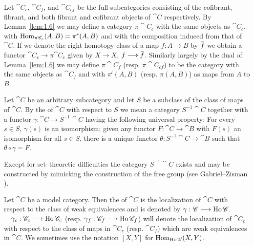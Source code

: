\documentclass[../main]{subfiles}
\begin{document}
Let ${\cat C}_c$, ${\cat C}_f$, and ${\cat C}_{cf}$ be the full subcategories consisting of the cofibrant, fibrant, and both fibrant and cofibrant objects of $\cat C$ respectively. By Lemma~\ref{lem:1.6} we may define a category $\pi \cat C_c$ with the same objects as ${\cat C}_c$, with \newline$\operatorname{Hom}_{\pi \mathscr{C}_c}(A, B) = \pi^r(A, B)$ and with the composition induced from that of $\cat C$. If we denote the right homotopy class of a map $f : A \longrightarrow B$ by $\xoverline f$ we obtain a functor ${\cat C}_c \longrightarrow \pi {\cat C}_c$ given by $X \longrightarrow X$, $f \longrightarrow \xoverline f$. Similarly largely by the dual of Lemma~\ref{lem:1.6} we may define $\pi \cat C_f$ (resp. $\pi \cat C_{cf}$) to be the category with the same objects as ${\cat C}_f$ and with $\pi^l(A, B)$ (resp. $\pi(A, B)$) as maps from $A$ to $B$. 

\begin{definition}\label{def:1.1.5}
Let $\cat C$ be an arbitrary subcategory and let $S$ be a subclass of the class of maps of $\cat C$. By the  of $\cat C$ with respect to $S$ we mean a category $S^{-1} \cat C$ together with a functor $\gamma : \cat C \longrightarrow S^{-1} \cat C$ having the following universal property: For every $s \in S$, $\gamma(s)$ is an isomorphism; given any functor $F  : \cat C \longrightarrow \cat B$ with $F(s)$ an isomorphism for all $s \in S$, there is a unique functor $\theta : S^{-1} \cat C \longrightarrow \cat B$ such that $\theta \circ \gamma = F$. 
\end{definition}

Except for set--theoretic difficulties the category $S^{-1} \cat C$ exists and may be constructed by mimicking the construction of the free group (see Gabriel--Zisman \cite{gabriel_calculus_1967}).

\begin{definition}\label{def:1.1.6}
Let $\cat C$ be a model category. Then the  of $\cat C$ is the localization of $\cat C$ with respect to the class of weak equivalences and is denoted by $\gamma : \mathscr{C} \longrightarrow \operatorname{Ho} \mathscr{C}$. $\quad\gamma_c : \mathscr{C}_c \longrightarrow \operatorname{Ho} \mathscr{C}_c$ (resp. $\gamma_f : \mathscr{C}_f \longrightarrow \operatorname{Ho} \mathscr{C}_f$) will denote the localization of $\cat C_c$ with respect to the class of maps in $\cat C_c$ (resp. $\cat C_f$) which are weak equivalences in $\cat C$. We sometimes use the notation $[X ,Y]$ for $\operatorname{Hom}_{\operatorname{Ho} \mathscr{C}}(X, Y)$.
\end{definition} 
\end{document}

